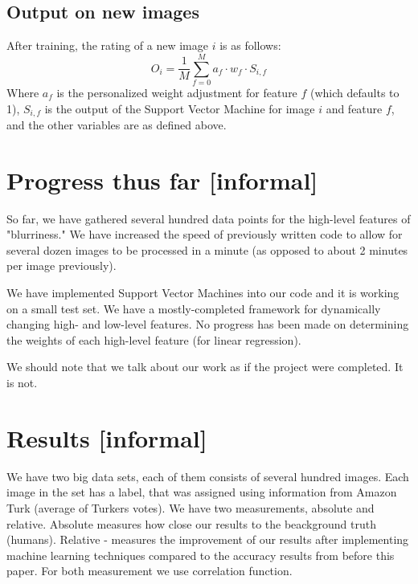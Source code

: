 \documentclass[11pt,letter]{article}
\begin{document}
\subsection{Output on new images}
After training, the rating of a new image $i$ is as follows:
\[
O_i=\frac{1}{M}\displaystyle\sum\limits_{f=0}^Ma_f \cdot w_f \cdot S_{i,f}
\]
Where $a_f$ is the personalized weight adjustment for feature $f$ (which defaults to 1), $S_{i,f}$ is the output of the Support Vector Machine for image $i$ and feature $f$, and the other variables are as defined above.


\section{Progress thus far [informal]}
So far, we have gathered several hundred data points for the high-level features of "blurriness." We have increased the speed of previously written code to allow for several dozen images to be processed in a minute (as opposed to about 2 minutes per image previously).

We have implemented Support Vector Machines into our code and it is working on a small test set. We have a mostly-completed framework for dynamically changing high- and low-level features. No progress has been made on determining the weights of each high-level feature (for linear regression).

We should note that we talk about our work as if the project were completed. It is not.


\section{Results [informal]}
We have two big data sets, each of them consists of several hundred images. 
Each image in the set has a label, that was assigned using information from Amazon Turk
(average of Turkers votes).
We have two measurements,
absolute and relative. Absolute measures how close our results
to the beackground truth (humans). Relative - measures the improvement
of our results after implementing machine learning techniques compared 
to the accuracy results from before this paper.
For both measurement we use correlation function.





\end{document}
